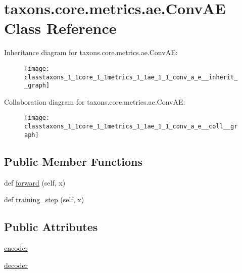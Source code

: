 \hypertarget{classtaxons_1_1core_1_1metrics_1_1ae_1_1_conv_a_e}{}\section{taxons.\+core.\+metrics.\+ae.\+Conv\+AE Class Reference}
\label{classtaxons_1_1core_1_1metrics_1_1ae_1_1_conv_a_e}


Inheritance diagram for taxons.\+core.\+metrics.\+ae.\+Conv\+AE\+:
\nopagebreak
\begin{figure}[H]
\begin{center}
\leavevmode
\texttt{[image: classtaxons\_1\_1core\_1\_1metrics\_1\_1ae\_1\_1\_conv\_a\_e\_\_inherit\_\_graph]}
\end{center}
\end{figure}


Collaboration diagram for taxons.\+core.\+metrics.\+ae.\+Conv\+AE\+:
\nopagebreak
\begin{figure}[H]
\begin{center}
\leavevmode
\texttt{[image: classtaxons\_1\_1core\_1\_1metrics\_1\_1ae\_1\_1\_conv\_a\_e\_\_coll\_\_graph]}
\end{center}
\end{figure}
\subsection*{Public Member Functions}
\begin{DoxyCompactItemize}
\item 
def \hyperlink{classtaxons_1_1core_1_1metrics_1_1ae_1_1_conv_a_e_ac016b2ab55fada0fb86249dd581ce34d}{forward} (self, x)
\item 
def \hyperlink{classtaxons_1_1core_1_1metrics_1_1ae_1_1_conv_a_e_ac2466423236dc9263e1b894c58d9fc0e}{training\+\_\+step} (self, x)
\end{DoxyCompactItemize}
\subsection*{Public Attributes}
\begin{DoxyCompactItemize}
\item 
\hyperlink{classtaxons_1_1core_1_1metrics_1_1ae_1_1_conv_a_e_a0d77209045e8097fab50ec3cb16cf6d4}{encoder}
\item 
\hyperlink{classtaxons_1_1core_1_1metrics_1_1ae_1_1_conv_a_e_a89ec0833ed8f6d1131d2d4d03be65786}{decoder}
\end{DoxyCompactItemize}


